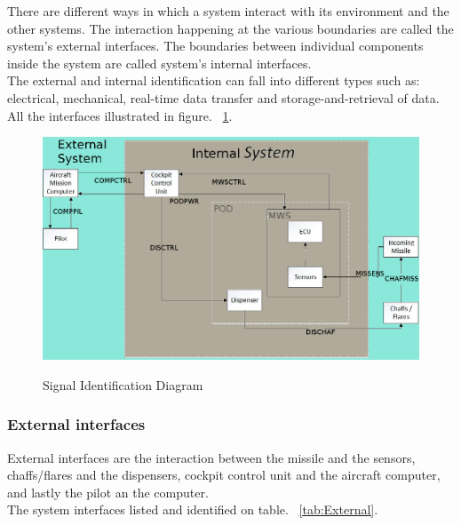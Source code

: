 There are different ways in which a system interact with its environment and the other systems. The interaction happening at the various boundaries are called the system's external interfaces. The boundaries between individual components inside the system are called system's internal interfaces.\\
The external and internal identification can fall into different types such as: electrical, mechanical, real-time data transfer and storage-and-retrieval of data. All the interfaces illustrated in figure. ~\ref{fig:sigFlowDiagram}.

  \begin{figure}[h]
  	\centering
 	\includegraphics[scale=0.5]{./images/SignalFlowDiagramDDD_v2}\\
  	\caption{Signal Identification Diagram}
      \label{fig:sigFlowDiagram}
  \end{figure}

\subsubsection{External interfaces}
 External interfaces are the interaction between the missile and the sensors, chaffs/flares and the dispensers, cockpit control unit and the aircraft computer, and lastly the pilot an the computer.\\
 The system interfaces listed and identified on table. ~\ref{tab:External}.


